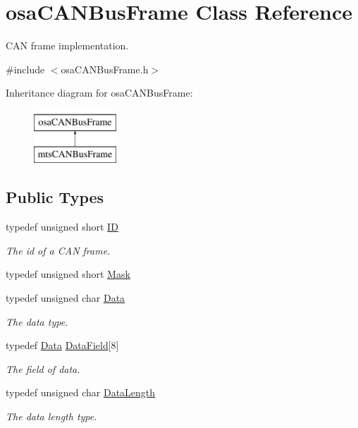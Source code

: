 \hypertarget{classosa_c_a_n_bus_frame}{}\section{osa\+C\+A\+N\+Bus\+Frame Class Reference}
\label{classosa_c_a_n_bus_frame}


C\+A\+N frame implementation.  




{\ttfamily \#include $<$osa\+C\+A\+N\+Bus\+Frame.\+h$>$}

Inheritance diagram for osa\+C\+A\+N\+Bus\+Frame\+:\begin{figure}[H]
\begin{center}
\leavevmode
\includegraphics[height=2.000000cm]{df/da8/classosa_c_a_n_bus_frame}
\end{center}
\end{figure}
\subsection*{Public Types}
\begin{DoxyCompactItemize}
\item 
typedef unsigned short \hyperlink{classosa_c_a_n_bus_frame_ae917bcfe6427b2055a405716909c6048}{I\+D}
\begin{DoxyCompactList}\small\item\em The id of a C\+A\+N frame. \end{DoxyCompactList}\item 
typedef unsigned short \hyperlink{classosa_c_a_n_bus_frame_a28c1ee7996aa3559ed24871ab5bd9d0d}{Mask}
\item 
typedef unsigned char \hyperlink{classosa_c_a_n_bus_frame_a938f540c9de33b240d3bc4f21c341ba5}{Data}
\begin{DoxyCompactList}\small\item\em The data type. \end{DoxyCompactList}\item 
typedef \hyperlink{classosa_c_a_n_bus_frame_a938f540c9de33b240d3bc4f21c341ba5}{Data} \hyperlink{classosa_c_a_n_bus_frame_ac41162892eefb85a1308d485ec630969}{Data\+Field}\mbox{[}8\mbox{]}
\begin{DoxyCompactList}\small\item\em The field of data. \end{DoxyCompactList}\item 
typedef unsigned char \hyperlink{classosa_c_a_n_bus_frame_ab5bacbd4959a9046925438af889744f4}{Data\+Length}
\begin{DoxyCompactList}\small\item\em The data length type. \end{DoxyCompactList}\end{DoxyCompactItemize}
